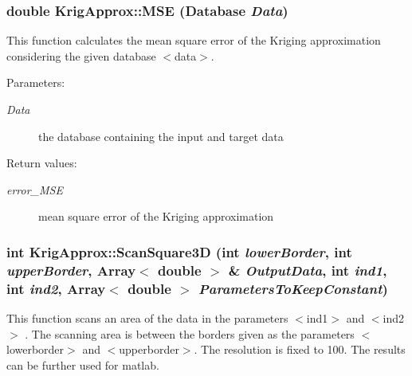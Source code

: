 \subsubsection{\setlength{\rightskip}{0pt plus 5cm}double Krig\-Approx::MSE (Database {\em Data})}\label{classKrigApprox_a2}


This function calculates the mean square error of the Kriging approximation considering the given database $<$data$>$. 

\begin{Desc}
\item[Parameters:]
\begin{description}
\item[{\em Data}]the database containing the input and target data \end{description}
\end{Desc}
\begin{Desc}
\item[Return values:]
\begin{description}
\item[{\em error\_\-MSE}]mean square error of the Kriging approximation \end{description}
\end{Desc}
\subsubsection{\setlength{\rightskip}{0pt plus 5cm}int Krig\-Approx::Scan\-Square3D (int {\em lower\-Border}, int {\em upper\-Border}, Array$<$ double $>$ \& {\em Output\-Data}, int {\em ind1}, int {\em ind2}, Array$<$ double $>$ {\em Parameters\-To\-Keep\-Constant})}\label{classKrigApprox_a13}


This function scans an area of the data in the parameters $<$ind1$>$ and $<$ind2$>$ . The scanning area is between the borders given as the parameters $<$lowerborder$>$ and $<$upperborder$>$. The resolution is fixed to 100. The results can be further used for matlab. 

